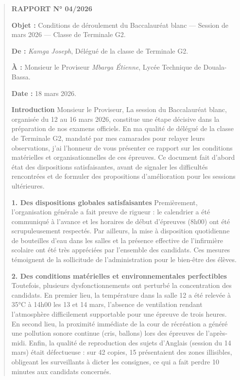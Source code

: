 \documentclass[11pt]{article}
\begin{document}
\begin{exemplebox}
\begin{quote}
\textbf{RAPPORT N° 04/2026}

\textbf{Objet :} Conditions de déroulement du Baccalauréat blanc — Session de mars 2026 — Classe de Terminale G2.

\textbf{De :} \textit{Kamga Joseph}, Délégué de la classe de Terminale G2.

\textbf{À :} Monsieur le Proviseur \textit{Mbarga Étienne}, Lycée Technique de Douala-Bassa.

\textbf{Date :} 18 mars 2026.

\textbf{Introduction}
Monsieur le Proviseur,
La session du Baccalauréat blanc, organisée du 12 au 16 mars 2026, constitue une étape décisive dans la préparation de nos examens officiels. En ma qualité de délégué de la classe de Terminale G2, mandaté par mes camarades pour relayer leurs observations, j'ai l'honneur de vous présenter ce rapport sur les conditions matérielles et organisationnelles de ces épreuves. Ce document fait d'abord état des dispositions satisfaisantes, avant de signaler les difficultés rencontrées et de formuler des propositions d'amélioration pour les sessions ultérieures.

\textbf{1. Des dispositions globales satisfaisantes}
Premièrement, l'organisation générale a fait preuve de rigueur : le calendrier a été communiqué à l'avance et les horaires de début d'épreuves (8h00) ont été scrupuleusement respectés. Par ailleurs, la mise à disposition quotidienne de bouteilles d'eau dans les salles et la présence effective de l'infirmière scolaire ont été très appréciées par l'ensemble des candidats. Ces mesures témoignent de la sollicitude de l'administration pour le bien-être des élèves.

\textbf{2. Des conditions matérielles et environnementales perfectibles}
Toutefois, plusieurs dysfonctionnements ont perturbé la concentration des candidats. En premier lieu, la température dans la salle 12 a été relevée à 35°C à 14h00 les 13 et 14 mars, l'absence de ventilation rendant l'atmosphère difficilement supportable pour une épreuve de trois heures. En second lieu, la proximité immédiate de la cour de récréation a généré une pollution sonore continue (cris, ballons) lors des épreuves de l'après-midi. Enfin, la qualité de reproduction des sujets d'Anglais (session du 14 mars) était défectueuse : sur 42 copies, 15 présentaient des zones illisibles, obligeant les surveillants à dicter les consignes, ce qui a fait perdre 10 minutes aux candidats concernés.


\end{quote}
\end{exemplebox}
\end{document}
